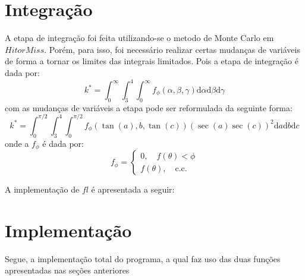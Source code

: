 \documentclass [a4paper,10pt]{article}
\begin{document}
\section{Integração}
A etapa de integração foi feita utilizando-se o metodo de Monte Carlo em $Hit or Miss$. Porém, para isso,
foi necessário realizar certas mudanças de variáveis de forma a tornar os limites das integrais limitados. Pois
a etapa de integração é dada por:
\begin{equation}
    k^* = \int_0^{\infty}\int_3^{4}\int_0^{\infty}f_{\phi}(\alpha,\beta,\gamma)\mathrm{d}\alpha\mathrm{d}\beta\mathrm{d}\gamma
\end{equation}
com as mudanças de variáveis a etapa pode ser reformulada da seguinte forma:
\begin{equation}
    k^* = \int_0^{\pi/2}\int_3^{4}\int_0^{\pi/2}f_{\phi}(\tan(a),b,\tan(c))(\sec(a)\sec(c))^2\mathrm{d}a\mathrm{d}b\mathrm{d}c
\end{equation}
onde a $f_{\phi}$ é dada por:
\[
    f_{\phi} = \left\{\begin{array}{l}
                    0,\quad f(\theta) < \phi\\
                    f(\theta),\quad \mathrm{c.c.}
               \end{array}\right.
\]

A implementação de $fl$ é apresentada a seguir:
{\linespread{1.15}}

\section{Implementação}
Segue, a implementação total do programa, a qual faz uso das duas funções apresentadas nas seções anteriores
{\linespread{1.15}}
\end{document}
